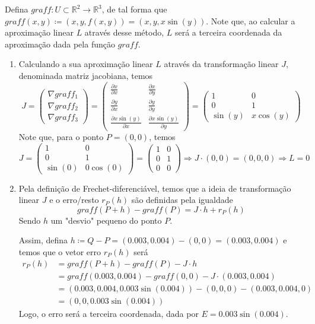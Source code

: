 \documentclass[../main.tex]{subfiles}
\begin{document}
		\begin{solucao}
			Defina $graff\colon U\subset \mathbb{R}^2\to \mathbb{R}^3$, de tal forma que $graff(x,y)\coloneq (x,y,f(x,y))=(x,y,x\sin(y))$. Note que, ao calcular a aproximação linear $L$ através desse método, $L$ será a terceira coordenada da aproximação dada pela função $graff$.
			\begin{enumerate}[label=\alph*)]
				\item Calculando a sua aproximação linear $L$ através da transformação linear $J$, denominada matriz jacobiana, temos
				\[
				J=\begin{pmatrix}\nabla graff_1\\\nabla graff_2\\\nabla graff_3\end{pmatrix} =\begin{pmatrix}\tfrac{\partial x}{\partial x}&\tfrac{\partial x}{\partial y}\\\tfrac{\partial y}{\partial x} & \tfrac{\partial y}{\partial y}\\\tfrac{\partial x\sin(y)}{\partial x}&\tfrac{\partial x\sin(y)}{\partial y}\end{pmatrix}=\begin{pmatrix}1&0\\0 & 1\\\sin(y)&x\cos(y)\end{pmatrix}
				\]
				Note que, para o ponto $P=(0,0)$, temos
				\[
				J=\begin{pmatrix}1&0\\0 & 1\\\sin(0)&0\cos(0)\end{pmatrix}=\begin{pmatrix}1&0\\0 & 1\\0&0\end{pmatrix}\Rightarrow J\cdot (0,0)=(0,0,0)\Rightarrow L=0
				\]
				\item Pela definição de Frechet-diferenciável, temos que a ideia de transformação linear $J$ e o erro/resto $r_P(h)$ são definidas pela igualdade
				\[
				graff(P+h)-graff(P)=J\cdot h+r_P(h)
				\]
				Sendo $h$ um "desvio" pequeno do ponto $P$.
				
				Assim, defina $h\coloneq Q-P=(0.003,0.004)-(0,0)=(0.003,0.004)$ e temos que o vetor erro $r_P(h)$ será
				\begin{align*}
					r_P(h)
					&=graff(P+h)-graff(P)-J\cdot h\\
					&=graff(0.003,0.004)-graff(0,0)-J\cdot (0.003,0.004)\\
					&=(0.003, 0.004, 0.003\sin(0.004)) -(0,0,0)-(0.003, 0.004, 0)\\
					&=(0,0,0.003\sin(0.004))
				\end{align*}
				Logo, o erro será a terceira coordenada, dada por $E=0.003\sin(0.004)$.
			\end{enumerate}
		\end{solucao}
		
\end{document}
